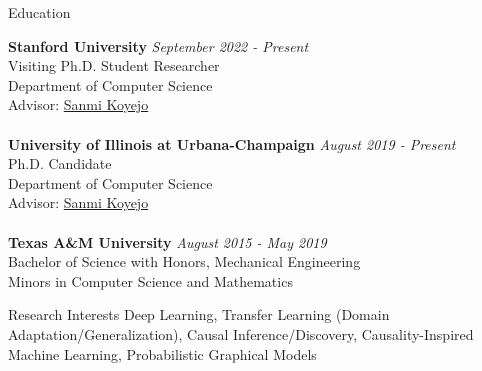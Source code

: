 \documentclass[11pt]{resume} %
\begin{document}
\singlespacing


\begin{rSection}{Education}

{\bf Stanford University} \hfill {\em September 2022 - Present} 
\\ Visiting Ph.D. Student Researcher
\\ Department of Computer Science
\\Advisor: \href{http://sanmi.cs.illinois.edu/}{Sanmi Koyejo}\\
\\{\bf University of Illinois at Urbana-Champaign} \hfill {\em August 2019 - Present} 
\\ Ph.D. Candidate
\\ Department of Computer Science
\\Advisor: \href{http://sanmi.cs.illinois.edu/}{Sanmi Koyejo}\\
\\{\bf Texas A\&M University} \hfill {\em August 2015 - May 2019} 
\\ Bachelor of Science with Honors, Mechanical Engineering
\\ Minors in Computer Science and Mathematics
\end{rSection}

\begin{rSection}{Research Interests}
Deep Learning, Transfer Learning (Domain Adaptation/Generalization), Causal Inference/Discovery, Causality-Inspired Machine Learning, Probabilistic Graphical Models
\end{rSection}

\end{document}
